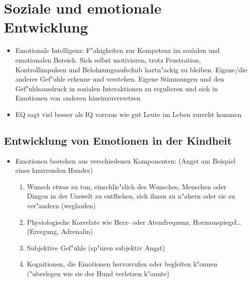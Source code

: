 
\section{Soziale und emotionale Entwicklung}
\begin{itemize}
	\item
		Emotionale Intelligenz: F"ahigkeiten zur Kompetenz im sozialen und emotionalen Bereich. Sich selbst motivieren, trotz Frustration, Kontrollimpulsen und Belohnungsaufschub hartn"ackig zu bleiben. Eigene/die anderer Gef"uhle erkenne und verstehen. Eigene Stimmungen und den Gef"uhlsausdruck in sozialen Interaktionen zu regulieren und sich in Emotionen von anderen hineinzuversetzen
	\item
		EQ sagt viel besser als IQ vorraus wie gut Leute im Leben zurecht kommen
\end{itemize}

\subsection{Entwicklung von Emotionen in der Kindheit}
\begin{itemize}
	\item
		Emotionen bestehen aus verschiedenen Komponenten: (Angst am Beispiel eines knurrenden Hundes)
		\begin{enumerate}
			\item
				Wunsch etwas zu tun, einschlie"slich des Wunsches, Menschen oder Dingen in der Umwelt zu entfliehen, sich ihnen zu n"ahern oder sie zu ver"andern  (weglaufen)
			\item
				Physiologische Korrelate wie Herz- oder Atemfrequenz, Hormonspiegel\dots (Erregung, Adrenalin)
			\item
				Subjektive Gef"uhle (sp"uren subjektiv Angst)
			\item
				Kognitionen, die Emotionen hervorrufen oder begleiten k"onnen ("uberlegen wie sie der Hund verletzen k"onnte)
	\end{enumerate}
\end{itemize}

